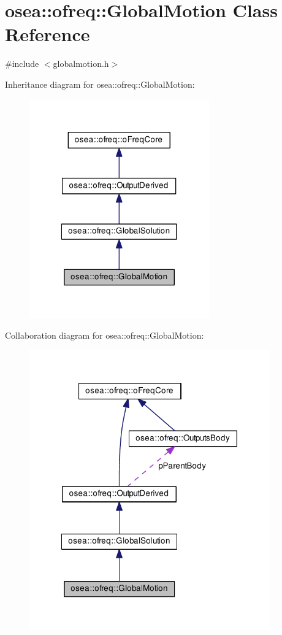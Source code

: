 \hypertarget{classosea_1_1ofreq_1_1_global_motion}{\section{osea\-:\-:ofreq\-:\-:Global\-Motion Class Reference}
\label{classosea_1_1ofreq_1_1_global_motion}
}


{\ttfamily \#include $<$globalmotion.\-h$>$}



Inheritance diagram for osea\-:\-:ofreq\-:\-:Global\-Motion\-:\nopagebreak
\begin{figure}[H]
\begin{center}
\leavevmode
\includegraphics[width=220pt]{classosea_1_1ofreq_1_1_global_motion__inherit__graph}
\end{center}
\end{figure}


Collaboration diagram for osea\-:\-:ofreq\-:\-:Global\-Motion\-:
\nopagebreak
\begin{figure}[H]
\begin{center}
\leavevmode
\includegraphics[width=294pt]{classosea_1_1ofreq_1_1_global_motion__coll__graph}
\end{center}
\end{figure}

